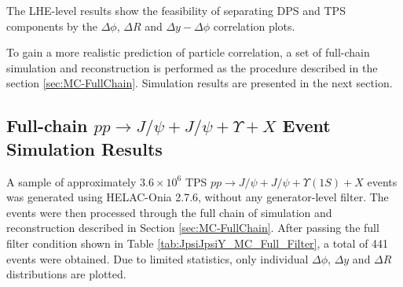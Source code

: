 \documentclass[10pt,twocolumn]{article}
\begin{document}
The LHE-level results show the feasibility of separating DPS and TPS components by the $\Delta \phi$, $\Delta R$ and $\Delta y - \Delta \phi$ correlation plots.

To gain a more realistic prediction of particle correlation, a set of full-chain simulation and reconstruction is performed as the procedure described in the section \ref{sec:MC-FullChain}. Simulation results are presented in the next section.

\subsection{Full-chain \texorpdfstring{$pp\to J/\psi+J/\psi+\Upsilon+X$}{pp -> J/psi + J/psi + Upsilon + X} Event Simulation Results}

A sample of approximately $3.6\times 10^6$ TPS $pp\to J/\psi+J/\psi+\Upsilon(1S)+X$ events was generated using HELAC-Onia 2.7.6, without any generator-level filter. The events were then processed through the full chain of simulation and reconstruction described in Section \ref{sec:MC-FullChain}. After passing the full filter condition shown in Table \ref{tab:JpsiJpsiY_MC_Full_Filter}, a total of 441 events were obtained. Due to limited statistics, only individual $\Delta \phi$, $\Delta y$ and $\Delta R$ distributions are plotted. 
\end{document}
